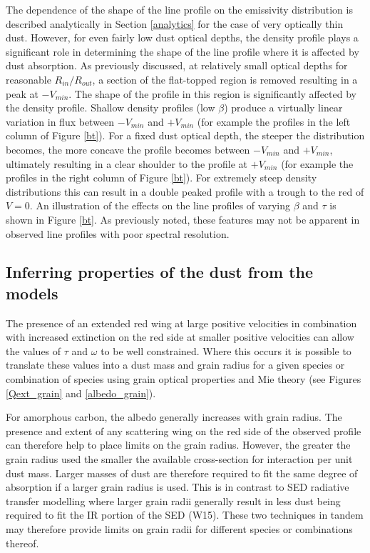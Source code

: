The dependence of the shape of the line profile on the emissivity 
distribution is described analytically in Section \ref{analytics} for the 
case of very optically thin dust.  However, for even fairly low dust 
optical depths, the density profile plays a significant role in 
determining the shape of the line profile where it is affected by dust 
absorption.  As previously discussed, at relatively small optical depths 
for reasonable $R_{in}/R_{out}$, a section of the flat-topped region is 
removed resulting in a peak at $-V_{min}$.  The shape of the profile in 
this region is significantly affected by the density profile.  Shallow 
density profiles (low $\beta$) produce a virtually linear variation in 
flux between $-V_{min}$ and $+V_{min}$ (for example the profiles in the 
left column of Figure \ref{bt}).  For a fixed dust optical depth, the 
steeper the distribution becomes, the more concave the profile becomes 
between $-V_{min}$ and $+V_{min}$, ultimately resulting in a clear 
shoulder to the profile at $+V_{min}$ (for example the profiles in the 
right column of Figure \ref{bt}).  For extremely steep density 
distributions this can result in a double peaked profile with a trough to 
the red of $V=0$.  An illustration of the effects on the line profiles of 
varying $\beta$ and $\tau$ is shown in Figure \ref{bt}.  As previously 
noted, these features may not be apparent in observed line profiles with 
poor spectral resolution.

\subsection{Inferring properties of the dust from the models}

The presence of an extended red wing at large positive velocities in 
combination with increased extinction on the red side at smaller positive 
velocities can allow the values of $\tau$ and $\omega$ to be well 
constrained.  Where this occurs it is possible to translate these values into a 
dust mass and grain radius for a given species or combination of 
species using grain optical properties and Mie theory (see Figures \ref{Qext_grain} and \ref{albedo_grain}).  


For amorphous carbon, the albedo generally increases with grain radius.  
The presence and extent of any scattering wing on the red side of the 
observed profile can therefore help to place limits on the grain radius.  
However, the greater the grain radius used the smaller the available 
cross-section for interaction per unit dust mass.  Larger masses of dust 
are therefore required to fit the same degree of absorption if a larger 
grain radius is used.  This is in contrast to SED radiative transfer 
modelling where larger grain radii generally result in less dust being 
required to fit the IR portion of the SED (W15).  These two techniques in 
tandem may therefore provide limits on grain radii for different species 
or combinations thereof.

